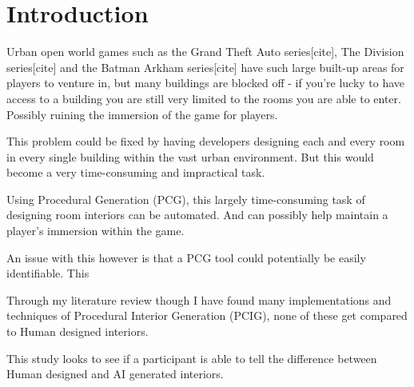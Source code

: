 \section{Introduction}

Urban open world games such as the Grand Theft Auto series[cite], The Division series[cite] and the Batman Arkham series[cite]
have such large built-up areas for players to venture in, but many buildings are blocked off - 
if you're lucky to have access to a building you are still very limited to the rooms you are able to enter.
Possibly ruining the immersion of the game for players.

This problem could be fixed by having developers designing each and every room in every single building within the vast urban environment.
But this would become a very time-consuming and impractical task.

Using Procedural Generation (PCG), this largely time-consuming task of designing room interiors can be automated. And can possibly help maintain a player's immersion within the game.

An issue with this however is that a PCG tool could potentially be easily identifiable. This 

Through my literature review though I have found many implementations and techniques of Procedural Interior Generation (PCIG), none of these get compared to Human designed interiors. 

This study looks to see if a participant is able to tell the difference between Human designed and AI generated interiors.






